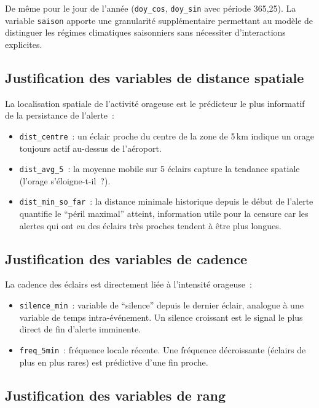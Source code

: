 \documentclass[a4paper,11pt]{article}
\begin{document}
De même pour le jour de l'année (\texttt{doy\_cos}, \texttt{doy\_sin} avec période 365,25).
La variable \texttt{saison} apporte une granularité supplémentaire permettant au modèle de
distinguer les régimes climatiques saisonniers sans nécessiter d'interactions explicites.

\subsection{Justification des variables de distance spatiale}

La localisation spatiale de l'activité orageuse est le prédicteur le plus informatif de la
persistance de l'alerte~:

\begin{itemize}[leftmargin=1.8em]
  \item \texttt{dist\_centre}~: un éclair proche du centre de la zone de 5\,km indique un orage
    toujours actif au-dessus de l'aéroport.
  \item \texttt{dist\_avg\_5}~: la moyenne mobile sur 5 éclairs capture la tendance spatiale
    (l'orage s'éloigne-t-il~?).
  \item \texttt{dist\_min\_so\_far}~: la distance minimale historique depuis le début de l'alerte
    quantifie le ``péril maximal'' atteint, information utile pour la censure car les alertes
    qui ont eu des éclairs très proches tendent à être plus longues.
\end{itemize}

\subsection{Justification des variables de cadence}

La cadence des éclairs est directement liée à l'intensité orageuse~:

\begin{itemize}[leftmargin=1.8em]
  \item \texttt{silence\_min}~: variable de ``silence'' depuis le dernier éclair, analogue à une
    variable de temps intra-événement. Un silence croissant est le signal le plus direct de fin
    d'alerte imminente.
  \item \texttt{freq\_5min}~: fréquence locale récente. Une fréquence décroissante (éclairs de
    plus en plus rares) est prédictive d'une fin proche.
\end{itemize}

\subsection{Justification des variables de rang}
\end{document}
